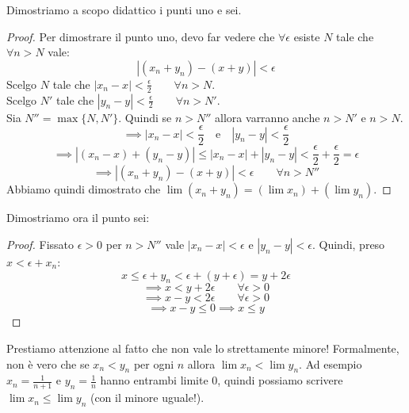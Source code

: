 Dimostriamo a scopo didattico i punti uno e sei.
\begin{proof}
Per dimostrare il punto uno, devo far vedere che $\forall \epsilon$ esiste $N$ tale che $\forall n > N$ vale:
\begin{equation*}
|(x_n + y_n) - (x+y)| < \epsilon
\end{equation*}
Scelgo $N$ tale che $|x_n-x| < \frac{\epsilon}{2} \qquad \forall n > N$. \\
Scelgo $N'$ tale che $|y_n-y| < \frac{\epsilon}{2} \qquad \forall n > N'$. \\
Sia $N'' = \max\{N, N'\}$.
Quindi se $n > N''$ allora varranno anche $n > N'$ e $n > N$.
\begin{equation*}
\implies |x_n - x| < \frac{\epsilon}{2} \quad \text{e} \quad |y_n - y| < \frac{\epsilon}{2}
\end{equation*}
\begin{equation*}
\implies |(x_n-x)+(y_n-y)| \le |x_n-x|+|y_n-y| < \frac{\epsilon}{2} + \frac{\epsilon}{2} = \epsilon
\end{equation*}
\begin{equation*}
\implies |(x_n+y_n) - (x+y)| < \epsilon \qquad \forall n > N''
\end{equation*}
Abbiamo quindi dimostrato che $\lim(x_n+y_n) = (\lim x_n) + (\lim y_n)$.
\end{proof}

Dimostriamo ora il punto sei:
\begin{proof}
Fissato $\epsilon > 0$ per $n > N''$ vale $|x_n-x| < \epsilon$ e $|y_n-y| < \epsilon$.
Quindi, preso $x < \epsilon + x_n$:
\begin{equation*}
x \le \epsilon + y_n < \epsilon + (y + \epsilon) = y + 2\epsilon
\end{equation*}
\begin{equation*}
\implies x < y + 2\epsilon \qquad \forall \epsilon > 0
\end{equation*}
\begin{equation*}
\implies x - y < 2\epsilon \qquad \forall \epsilon > 0
\end{equation*}
\begin{equation*}
\implies x - y \le 0 \implies x \le y
\end{equation*}
\end{proof}

Prestiamo attenzione al fatto che non vale lo strettamente minore! Formalmente, non è vero che se $x_n < y_n$ per ogni $n$ allora $\lim x_n < \lim y_n$. Ad esempio $x_n = \frac{1}{n + 1}$ e $y_n = \frac{1}{n}$ hanno entrambi limite $0$, quindi possiamo scrivere $\lim x_n \le \lim y_n$ (con il minore uguale!).

